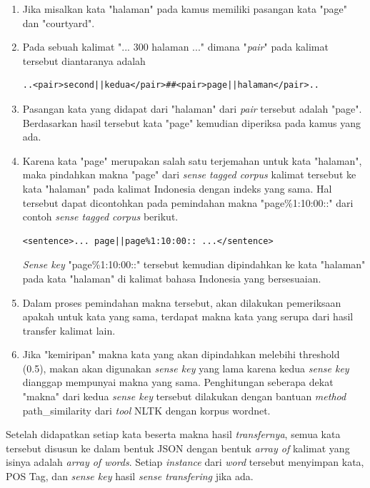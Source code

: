 \begin{enumerate}
	\item Jika misalkan kata "halaman" pada kamus memiliki pasangan kata "page" dan "courtyard".
	\item Pada sebuah kalimat "... 300 halaman ..." dimana "\textit{pair}" pada kalimat tersebut diantaranya adalah
	\begin{lstlisting}[backgroundcolor = \color{white}]
	..<pair>second||kedua</pair>##<pair>page||halaman</pair>..
	\end{lstlisting}
	\item Pasangan kata yang didapat dari "halaman" dari \textit{pair} tersebut adalah "page". Berdasarkan hasil tersebut kata "page" kemudian diperiksa pada kamus yang ada.
	\item Karena kata "page" merupakan salah satu terjemahan untuk kata "halaman", maka pindahkan makna "page" dari \textit{sense tagged corpus} kalimat tersebut ke kata "halaman" pada kalimat Indonesia dengan indeks yang sama. Hal tersebut dapat dicontohkan pada pemindahan makna "page\%1:10:00::" dari contoh \textit{sense tagged corpus} berikut.
	\begin{lstlisting}[backgroundcolor = \color{white}]
	<sentence>... page||page%1:10:00:: ...</sentence>
	\end{lstlisting}
	\textit{Sense key} "page\%1:10:00::" tersebut kemudian dipindahkan ke kata "halaman" pada kata "halaman" di kalimat bahasa Indonesia yang bersesuaian.
	\item Dalam proses pemindahan makna tersebut, akan dilakukan pemeriksaan apakah untuk kata yang sama, terdapat makna kata yang serupa dari hasil transfer kalimat lain.
	\item Jika "kemiripan" makna kata yang akan dipindahkan melebihi threshold (0.5), makan akan digunakan \textit{sense key} yang lama karena kedua \textit{sense key} dianggap mempunyai makna yang sama. Penghitungan seberapa dekat "makna" dari kedua \textit{sense key} tersebut dilakukan dengan bantuan \textit{method} path\_similarity dari \textit{tool} NLTK dengan korpus wordnet.
\end{enumerate}

Setelah didapatkan setiap kata beserta makna hasil \textit{transfernya}, semua kata tersebut disusun ke dalam bentuk JSON dengan bentuk \textit{array of} kalimat yang isinya adalah \textit{array of words}. Setiap \textit{instance} dari \textit{word} tersebut menyimpan kata, POS Tag, dan \textit{sense key} hasil \textit{sense transfering} jika ada.
